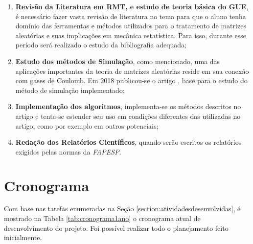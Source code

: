 \documentclass[12pt]{report}
\begin{document}
\begin{enumerate}
	\item \textbf{Revisão da Literatura em RMT, e estudo de teoria básica do GUE}, é necessário fazer vasta revisão de literatura no tema para que o aluno tenha domínio das ferramentas e métodos utilizados para o tratamento de matrizes aleatórias e suas implicações em mecânica estatística. Para isso, durante esse período será realizado o estudo da bibliografia adequada;
	
	\item \textbf{Estudo dos métodos de Simulação}, como mencionado, uma das aplicações importantes da teoria de matrizes aleatórias reside em sua conexão com gases de Coulomb. Em 2018 publicou-se o artigo \cite{Chafa2018}, base para o estudo do método de simulação implementado;
	
	\item \textbf{Implementação dos algoritmos}, implementa-se os métodos descritos no artigo e tenta-se estender seu uso em condições diferentes das utilizadas no artigo, como por exemplo em outros potenciais;
	
	\item \textbf{Redação dos Relatórios Científicos}, quando serão escritos os relatórios exigidos pelas normas da \textit{FAPESP}.
	
\end{enumerate}

\section{Cronograma}

Com base nas tarefas enumeradas na Seção \ref{section:atividadesdesenvolvidas}, é mostrado na Tabela \ref{tab:cronograma1ano} o cronograma atual de desenvolvimento do projeto. Foi possível realizar todo o planejamento feito inicialmente.

\end{document}
